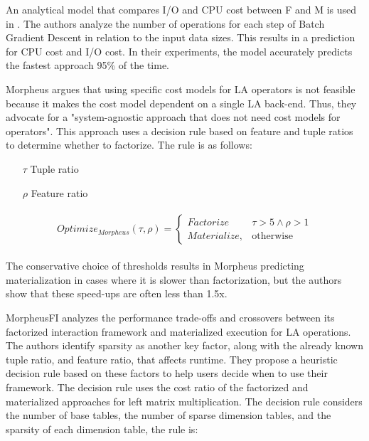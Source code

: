 An analytical model that compares I/O and CPU cost between F and M is used in \cite{orion_learning_gen_lin_models}. The authors analyze the number of operations for each step of Batch Gradient Descent in relation to the input data sizes. This results in a prediction for CPU cost and I/O cost. In their experiments, the model accurately predicts the fastest approach 95\% of the time.


Morpheus \cite{morpheus} argues that using specific cost models for LA operators is not feasible because it makes the cost model dependent on a single LA back-end. Thus, they advocate for a "system-agnostic approach that does not need cost models for operators". This approach uses a decision rule based on feature and tuple ratios to determine whether to factorize. The rule is as follows:

\begin{definition} 

\begin{itemize}
    \item[]
    \item[$\tau$] Tuple ratio
    \item[$\rho$] Feature ratio
\end{itemize}
\small{
		\begin{align*}
			\begin{split} 
Optimize_{Morpheus}(\tau, \rho) =  \begin{cases}Factorize & \tau > 5 \wedge \rho > 1
\\Materialize, & \text{otherwise}\end{cases}
			\end{split}
		\end{align*}
	}
\end{definition}
The conservative choice of thresholds results in Morpheus predicting materialization in cases where it is slower than factorization, but the authors show that these speed-ups are often less than 1.5x.

MorpheusFI \cite{MorpheusFIEnablingOptimizingNonlinear2019} analyzes the performance trade-offs and crossovers between its factorized interaction framework and materialized execution for LA operations. The authors identify sparsity as another key factor, along with the already known tuple ratio, and feature ratio, that affects runtime. They propose a heuristic decision rule based on these factors to help users decide when to use their framework. The decision rule uses the cost ratio of the factorized and materialized approaches for left matrix multiplication. The decision rule considers the number of base tables, the number of sparse dimension tables, and the sparsity of each dimension table, the rule is:

